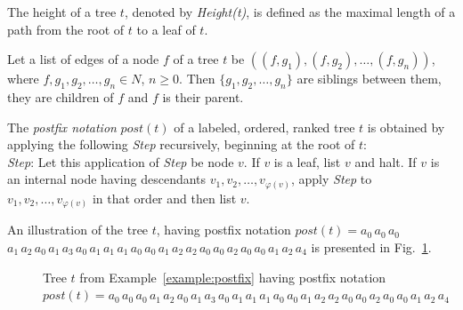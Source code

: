 \documentclass[preprint,12pt]{elsarticle}
\newenvironment{example}[1][Example]{\begin{trivlist}
\item[\hskip \labelsep {\bfseries #1}]}{\end{trivlist}}
\begin{document}
The height of a tree $t$, denoted by {\em Height(t)}, is defined as the maximal  length of a path from the root of $t$ to a leaf of $t$.

Let a list of edges of a node $f$ of a tree $t$ be $((f, g_1), (f, g_2),\ldots , (f, g_n))$, where $f, g_1, g_2, \ldots, g_n \in N$, $n \geq 0$. Then $\{g_1, g_2, \ldots, g_n\}$ are siblings between them, they are children of $f$ and $f$ is their parent.


The \emph{postfix notation} $\textit{post}(t)$ of a labeled, ordered, ranked tree $t$ 
is obtained by applying the following \emph{Step} recursively, beginning at the root of $t$:\\
\emph{Step}: Let this application of \emph{Step} be node $v$.  If $v$ is a leaf, list $v$ and 
halt. If $v$ is an internal node having descendants $v_1, v_2, \ldots, v_{\varphi(v)}$, apply
\emph{Step} to $v_1, v_2, \ldots, v_{\varphi(v)}$ in that order and then list $v$.

\begin{example}\label{example:postfix}
An illustration of the tree $t$, having postfix notation $\textit{post}(t) = a_0\, a_0\, a_0\,$ $a_1\, a_2\, a_0\, a_1\, a_3\, a_0\, a_1\, a_1\, a_1\, a_0\, a_0\, a_1\, a_2\, a_2\, a_0\, a_0\, a_2\, a_0\, a_0\, a_1\, a_2\, a_4$ is presented in Fig.~\ref{fig:tree}.
\end{example}

\begin{figure}
\begin{center}
\end{center}

\caption{Tree $t$ from Example~\ref{example:postfix} having postfix notation $\textit{post}(t)=a_0\, a_0\, a_0\, a_1\, a_2\, a_0\, a_1\, a_3\, a_0\, a_1\, a_1\, a_1\, a_0\, a_0\, a_1\, a_2\, a_2\, a_0\, a_0\, a_2\, a_0\, a_0\, a_1\, a_2\, a_4$}
\label{fig:tree}
\end{figure}
\end{document}
